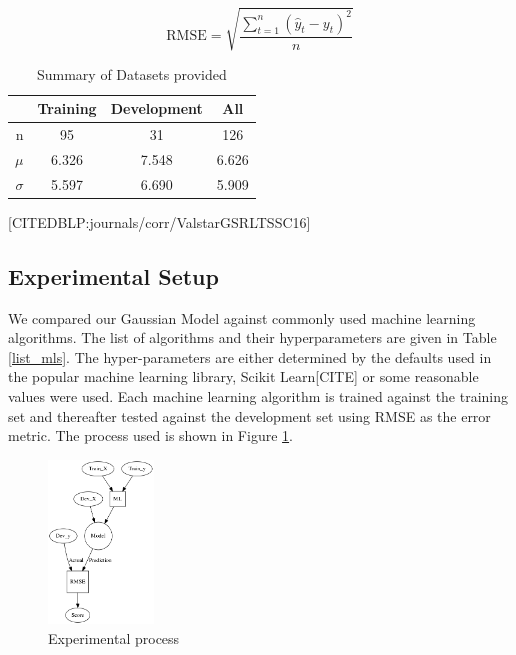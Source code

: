 \documentclass{article}
\begin{document}
 \begin{equation}\label{eq:rmse}
  \text{RMSE} = \sqrt{\frac{\sum_{t=1}^n (\hat y_t - y_t)^2}{n}}
 \end{equation}
 \begin{table}
  \begin{center}
   \begin{tabular}{ | r | c | c || c | }
    \hline
    & Training & Development & All \\ \hline
    n               & 95 & 31 & 126 \\ \hline
    $\mu$           & 6.326 & 7.548 & 6.626 \\ \hline
    $\sigma$        & 5.597 & 6.690 & 5.909 \\ \hline
   \end{tabular}
  \end{center}
  \caption{Summary of Datasets provided}
  \label{summary_table}
 \end{table}
 [CITEDBLP:journals/corr/ValstarGSRLTSSC16]
 
 \subsection{Experimental Setup}
 We compared our Gaussian Model against commonly used machine learning algorithms. The list of algorithms and their hyperparameters are given in Table \ref{list_mls}. The hyper-parameters are either determined by the defaults used in the popular machine learning library, Scikit Learn[CITE] or some reasonable values were used. Each machine learning algorithm is trained against the training set and thereafter tested against the development set using RMSE as the error metric. The process used is shown in Figure \ref{process}.
	\begin{figure}
 	\begin{center}
   \includegraphics[width=0.25\textwidth]{process}
  \end{center}
  \caption{Experimental process}
  \label{process}
 \end{figure}

\end{document}
